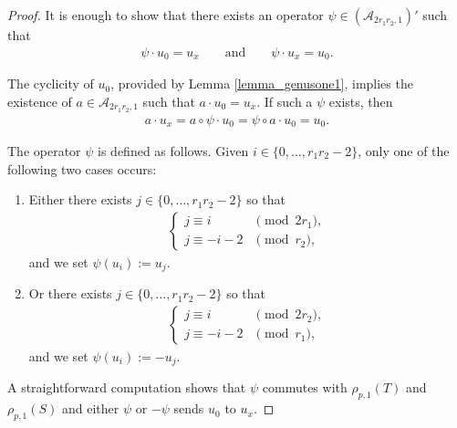 \documentclass[11pt]{article}
\numberwithin{equation}{section}
\begin{document}
\begin{proof} It is enough to show that there exists an operator $\psi \in (\mathcal{A}_{2r_1r_2,1})'$ such that
\begin{gather*} \psi \cdot u_0 = u_x \qquad \text{and} \qquad \psi \cdot u_x =u_0.\end{gather*}

The cyclicity of $u_0$, provided by Lemma \ref{lemma_genusone1}, implies the existence of $a\in\mathcal{A}_{2r_1r_2,1}$ such that
$a\cdot u_0 = u_x$. If such a $\psi$ exists, then
\begin{gather*} a\cdot u_x = a \circ \psi \cdot u_0 = \psi \circ a \cdot u_0 = u_0.\end{gather*}

The operator $\psi$ is defined as follows. Given $i\in \{0, \ldots, r_1r_2-2\}$, only one of the following two cases occurs:
\begin{enumerate}\itemsep=0pt
\item Either there exists $j\in\{0, \ldots, r_1r_2-2 \}$ so that
\begin{gather*} \begin{cases}
j\equiv i & \pmod{2r_1}, \\
j\equiv -i-2 & \pmod{r_2},
\end{cases}\end{gather*}
 and we set $\psi(u_i):=u_j$.
\item Or there exists $j\in\{0, \ldots, r_1r_2-2 \}$ so that
\begin{gather*} \begin{cases}
j\equiv i & \pmod{2r_2}, \\
j\equiv -i-2& \pmod{r_1},
\end{cases}\end{gather*}
 and we set $\psi(u_i):=-u_j$.
\end{enumerate}
A straightforward computation shows that $\psi$ commutes with $\rho_{p,1}(T)$ and $\rho_{p,1}(S)$ and either $\psi$ or $-\psi$ sends $u_0$ to $u_x$.
\end{proof}
\end{document}
